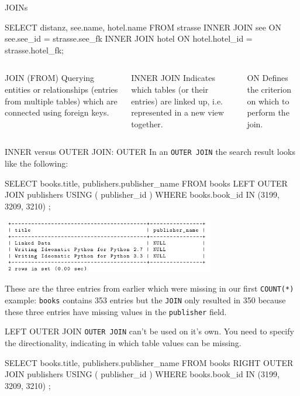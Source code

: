 \begin{frame}{JOINs}
\begin{sqlcode}
SELECT distanz, see.name, hotel.name 
FROM strasse 
INNER JOIN see ON see.see_id = strasse.see_fk 
INNER JOIN hotel 
ON hotel.hotel_id = strasse.hotel_fk;
\end{sqlcode}


\begin{columns}
\begin{block}{JOIN (FROM)}\footnotesize
Querying entities or relationships (entries from multiple tables) which are connected using foreign keys. 
\end{block}

\begin{block}{INNER JOIN}\footnotesize
Indicates which tables (or their entries) are linked up, i.e. represented in a new view together. 

\end{block}

\begin{block}{ON}\footnotesize
Defines the criterion on which to perform the join.
\end{block}
\end{columns}

\framebreak 

\begin{block}{INNER versus OUTER JOIN: OUTER}\footnotesize
In an \texttt{OUTER JOIN} the search result looks like the following:
\begin{sqlcode}
SELECT books.title, publishers.publisher_name
FROM books
LEFT OUTER JOIN publishers USING ( publisher_id )
WHERE books.book_id IN (3199, 3209, 3210) ;
\end{sqlcode}
\centering\includegraphics[width=0.7\textwidth]{img/outer-join-null.png}
\medskip
\end{block}
\footnotesize
These are the three entries from earlier which were missing in our first \texttt{COUNT(*)} example: \texttt{books} contains 353 entries but the \texttt{JOIN} only resulted in 350 because these three entries have missing values in the \texttt{publisher} field. 

\framebreak 

\begin{block}{LEFT OUTER JOIN}\small
\texttt{OUTER JOIN} can't be used on it's own. You need to specify the directionality, indicating in which table values can be missing.
\begin{sqlcode}
SELECT books.title, publishers.publisher_name
FROM books
RIGHT OUTER JOIN publishers USING ( publisher_id )
WHERE books.book_id IN (3199, 3209, 3210) ;
\end{sqlcode}


\end{block}
\end{frame}
